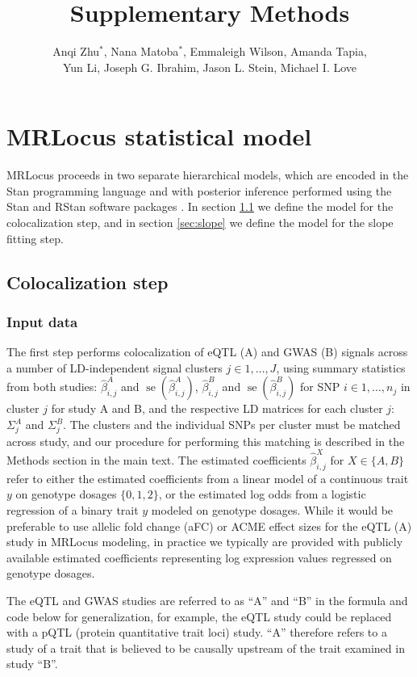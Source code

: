 \documentclass[11pt]{article}
\title{Supplementary Methods}
\author{Anqi Zhu$^*$, Nana Matoba$^*$, Emmaleigh Wilson, Amanda Tapia,
  \\ Yun Li, Joseph G. Ibrahim, Jason L. Stein, Michael I. Love}
\DeclareMathOperator{\se}{\textrm{se}}
\begin{document}
\maketitle
\section{MRLocus statistical model}

MRLocus proceeds in two separate hierarchical models, which are
encoded in the Stan programming language and with posterior
inference performed using the Stan and RStan software packages
\citep{stan,rstan}. In section \ref{sec:coloc} we define the
model for the colocalization step, and in section \ref{sec:slope} we
define the model for the slope fitting step.

\subsection{Colocalization step} \label{sec:coloc}

\subsubsection{Input data}

The first step performs colocalization of eQTL (A) and GWAS (B)
signals across a number of LD-independent signal clusters
$j \in 1,\dots,J$, using summary statistics from both studies:
$\widehat{\beta}^A_{i,j}$ and $\se(\widehat{\beta}^A_{i,j})$,
$\widehat{\beta}^B_{i,j}$ and $\se(\widehat{\beta}^B_{i,j})$
for SNP $i \in 1,\dots,n_j$ in cluster $j$ for study A and B,
and the respective LD matrices for each cluster $j$:
$\Sigma_j^A$ and $\Sigma_j^B$.
The clusters and the individual SNPs per cluster must be matched across
study, and our procedure for performing this matching is described in
the Methods section in the main text.
The estimated coefficients $\widehat{\beta}^X_{i,j}$ for
$X \in \{A,B\}$ refer to either the estimated coefficients from a
linear model of a continuous trait $y$ on genotype dosages
$\{0,1,2\}$, or the estimated log odds from a logistic regression of a
binary trait $y$ modeled on genotype dosages. While it would be
preferable to use allelic fold change (aFC) \citep{aFC} or ACME effect sizes
\citep{ACME} for the eQTL (A) study in MRLocus modeling, in practice
we typically are provided with publicly available estimated
coefficients representing log expression values regressed on genotype
dosages.

The eQTL and GWAS studies are referred to as ``A'' and ``B'' in the
formula and code below for generalization, for example, the eQTL study
could be replaced with a pQTL (protein quantitative trait loci)
study. ``A'' therefore refers to a study of a trait that is believed
to be causally upstream of the trait examined in study ``B''.
\end{document}
